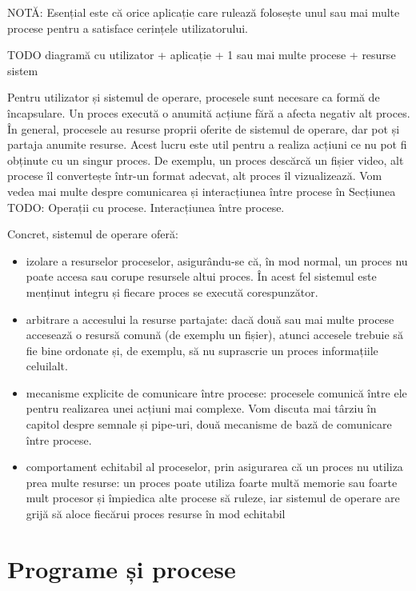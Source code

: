 NOTĂ: Esențial este că orice aplicație care rulează folosește unul sau mai multe procese pentru a satisface cerințele utilizatorului.

TODO diagramă cu utilizator + aplicație + 1 sau mai multe procese + resurse sistem

Pentru utilizator și sistemul de operare, procesele sunt necesare ca formă de
încapsulare. Un proces execută o anumită acțiune fără a afecta negativ alt
proces. În general, procesele au resurse proprii oferite de sistemul de operare,
dar pot și partaja anumite resurse. Acest lucru este util pentru a realiza
acțiuni ce nu pot fi obținute cu un singur proces. De exemplu, un proces
descărcă un fișier video, alt procese îl convertește într-un format adecvat, alt
proces îl vizualizează. Vom vedea mai multe despre comunicarea și interacțiunea
între procese în Secțiunea TODO: Operații cu procese. Interacțiunea între
procese.

Concret, sistemul de operare oferă:

\begin{itemize}
	\item izolare a resurselor proceselor, asigurându-se că, în mod normal,
		un proces nu poate accesa sau corupe resursele altui proces. În
		acest fel sistemul este menținut integru și fiecare proces se
		execută corespunzător.
	\item arbitrare a accesului la resurse partajate: dacă două sau mai
		multe procese accesează o resursă comună (de exemplu un fișier),
		atunci accesele trebuie să fie bine ordonate și, de exemplu, să
		nu suprascrie un proces informațiile celuilalt.
	\item mecanisme explicite de comunicare între procese: procesele
		comunică între ele pentru realizarea unei acțiuni mai complexe.
		Vom discuta mai târziu în capitol despre semnale și pipe-uri,
		două mecanisme de bază de comunicare între procese.
	\item comportament echitabil al proceselor, prin asigurarea că un proces
		nu utiliza prea multe resurse: un proces poate utiliza foarte
		multă memorie sau foarte mult procesor și împiedica alte procese
		să ruleze, iar sistemul de operare are grijă să aloce fiecărui
		proces resurse în mod echitabil
\end{itemize}

\section{Programe și procese}

